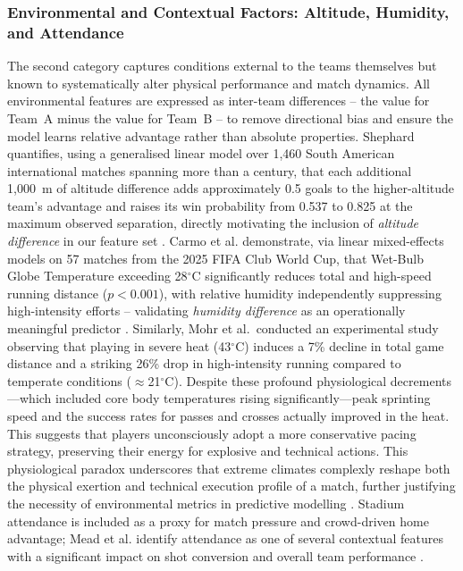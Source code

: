 \documentclass[a4paper,twoside]{article}
\begin{document}
\subsubsection*{Environmental and Contextual Factors: Altitude, Humidity, and Attendance}
The second category captures conditions external to the teams themselves but known to systematically alter physical performance and match dynamics.
All environmental features are expressed as inter-team differences -- the value for Team~A minus the value for Team~B -- to remove directional bias and ensure the model learns relative advantage rather than absolute properties.
Shephard quantifies, using a generalised linear model over 1,460 South American international matches spanning more than a century, that each additional 1,000~m of altitude difference adds approximately 0.5 goals to the higher-altitude team's advantage and raises its win probability from 0.537 to 0.825 at the maximum observed separation, directly motivating the inclusion of \textit{altitude difference} in our feature set \cite{shephard_altitude_2008}.
Carmo et al. demonstrate, via linear mixed-effects models on 57 matches from the 2025 FIFA Club World Cup, that Wet-Bulb Globe Temperature exceeding 28$^{\circ}$C significantly reduces total and high-speed running distance ($p < 0.001$), with relative humidity independently suppressing high-intensity efforts -- validating \textit{humidity difference} as an operationally meaningful predictor \cite{carmo_physical_2026}.
Similarly, Mohr et al.\ conducted an experimental study observing that playing in severe heat (43$^{\circ}$C) induces a 7\% decline in total game distance and a striking 26\% drop in high-intensity running compared to temperate conditions ($\approx$21$^{\circ}$C). Despite these profound physiological decrements---which included core body temperatures rising significantly---peak sprinting speed and the success rates for passes and crosses actually improved in the heat. This suggests that players unconsciously adopt a more conservative pacing strategy, preserving their energy for explosive and technical actions. This physiological paradox underscores that extreme climates complexly reshape both the physical exertion and technical execution profile of a match, further justifying the necessity of environmental metrics in predictive modelling \cite{mohr_physiological_2012}.
Stadium attendance is included as a proxy for match pressure and crowd-driven home advantage; Mead et al. identify attendance as one of several contextual features with a significant impact on shot conversion and overall team performance \cite{mead_expected_2023}.
\end{document}
